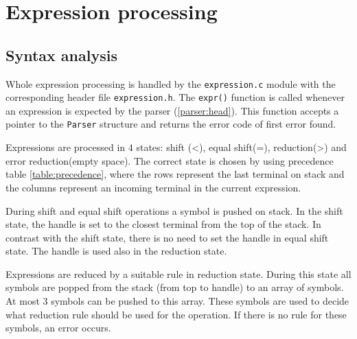 \section{Expression processing} \label{expressions}

\subsection{Syntax analysis}


Whole expression processing is handled by the \verb|expression.c| module with the corresponding header file \verb|expression.h|.
The \verb|expr()| function is called whenever an expression is expected by the parser (\ref{parser:head}). This function accepts a pointer to the \verb|Parser| structure and returns the error code of first error found. 

Expressions are processed in 4 states: shift (\textless), equal shift(=), reduction(\textgreater) and error reduction(empty space).
The correct state is chosen by using precedence table \ref{table:precedence}, where the rows represent the last terminal on stack and the columns represent an incoming terminal in the current expression.

During shift and equal shift operations a symbol is pushed on stack. In the shift state, the handle is set to the closest terminal from the top of the stack. 
In contrast with the shift state, there is no need to set the handle in equal shift state.
The handle is used also in the reduction state. 

Expressions are reduced by a suitable rule in reduction state. During this state  all symbols are popped from the stack (from top to handle) to an array of symbols. At most 3 symbols can be pushed to this array. These symbols are used to decide what reduction rule should be used for the operation. If there is no rule for these symbols, an error occurs.

